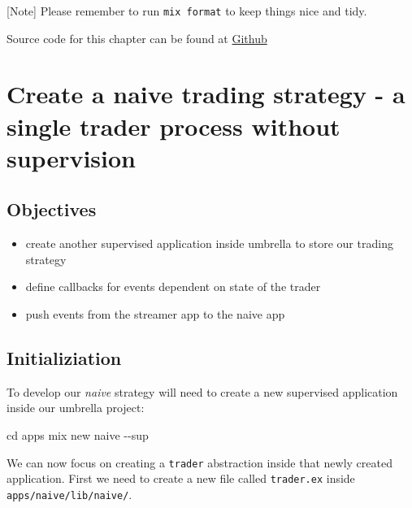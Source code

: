\documentclass[
]{book}
\newenvironment{Shaded}{\begin{snugshade}}{\end{snugshade}}
\newcommand{\AttributeTok}[1]{\textcolor[rgb]{0.77,0.63,0.00}{#1}}
\newcommand{\BuiltInTok}[1]{#1}
\newcommand{\ExtensionTok}[1]{#1}
\newcommand{\NormalTok}[1]{#1}
\providecommand{\tightlist}{%
  \setlength{\itemsep}{0pt}\setlength{\parskip}{0pt}}
\begin{document}
{[}Note{]} Please remember to run \texttt{mix\ format} to keep things nice and tidy.

Source code for this chapter can be found at \href{https://github.com/frathon/create-a-cryptocurrency-trading-bot-in-elixir-source-code/tree/chapter_01}{Github}

\hypertarget{create-a-naive-trading-strategy---a-single-trader-process-without-supervision}{%
\chapter{Create a naive trading strategy - a single trader process without supervision}\label{create-a-naive-trading-strategy---a-single-trader-process-without-supervision}}

\hypertarget{objectives-1}{%
\section{Objectives}\label{objectives-1}}

\begin{itemize}
\tightlist
\item
  create another supervised application inside umbrella to store our trading strategy
\item
  define callbacks for events dependent on state of the trader
\item
  push events from the streamer app to the naive app
\end{itemize}

\hypertarget{initializiation}{%
\section{Initializiation}\label{initializiation}}

To develop our \emph{naive} strategy will need to create a new supervised application inside our umbrella project:

\begin{Shaded}
\begin{Highlighting}[]
\BuiltInTok{cd}\NormalTok{ apps}
\ExtensionTok{mix}\NormalTok{ new naive }\AttributeTok{{-}{-}sup}
\end{Highlighting}
\end{Shaded}

We can now focus on creating a \texttt{trader} abstraction inside that newly created application. First we need to create a new file called \texttt{trader.ex} inside \texttt{apps/naive/lib/naive/}.
\end{document}
